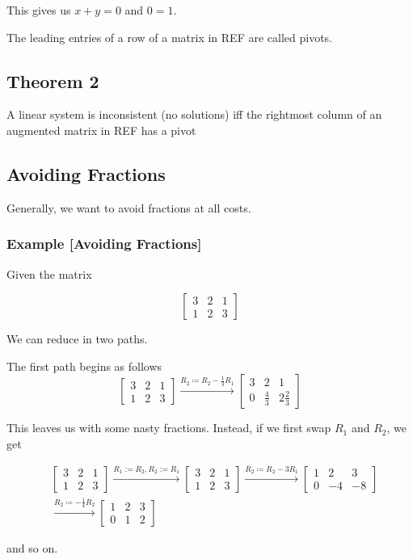 \documentclass[12pt]{article}
\begin{document}
This gives us $x+y = 0$ and $0=1$.

The leading entries of a row of a matrix in REF are called pivots.

\subsection{Theorem 2}

A linear system is inconsistent (no solutions) iff the rightmost column of
an augmented matrix in REF has a pivot

\subsection{Avoiding Fractions}

Generally, we want to avoid fractions at all costs.

\subsubsection{Example [Avoiding Fractions]}

Given the matrix

\[
  \begin{bmatrix}
    3 & 2 & 1 \\
    1 & 2 & 3
  \end{bmatrix}
\]

We can reduce in two paths.

The first path begins as follows
\[
  \begin{bmatrix}
    3 & 2 & 1 \\
    1 & 2 & 3
  \end{bmatrix}
  \xrightarrow{R_2\coloneqq R_2-\frac{1}{3} R_1}
  \begin{bmatrix}
    3 & 2 & 1 \\
    0 & \frac{4}{3} & 2\frac{2}{3}
  \end{bmatrix}
\]

This leaves us with some nasty fractions. Instead, if we first swap $R_1$ and 
$R_2$, we get

\[
  \begin{align}
    &\begin{bmatrix}
      3 & 2 & 1 \\
      1 & 2 & 3
    \end{bmatrix}
    \xrightarrow{R_1 := R_2, R_2 := R_1}
    \begin{bmatrix}
      3 & 2 & 1 \\
      1 & 2 & 3
    \end{bmatrix}
    \xrightarrow{R_2\coloneqq R_{2}-3R_1}
    \begin{bmatrix}
      1 & 2 & 3 \\
      0 & -4 & -8
    \end{bmatrix}\\
    &\xrightarrow{R_2\coloneqq -\frac{1}{4}R_2}
    \begin{bmatrix}
      1 & 2 & 3 \\
      0 & 1 & 2
    \end{bmatrix}
  \end{align}
\]

and so on.
\end{document}
